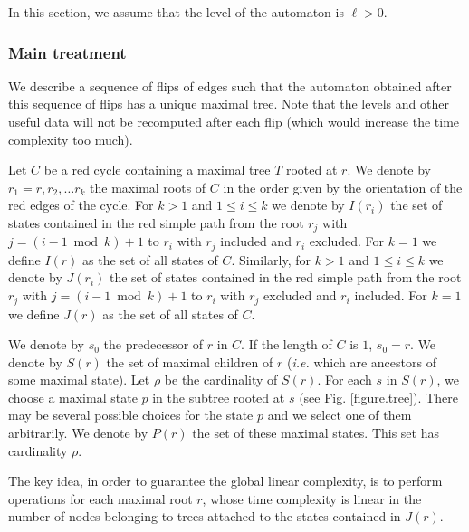 \documentclass[11pt,a4paper]{article}
\def\T{{T}}
\newcommand{\ie}{{\itshape i.e.}\xspace }
\begin{document}
In this section, we assume that the level of the automaton is $\ell > 0$.

\subsubsection{Main treatment}








We describe a sequence of flips of edges such that the automaton
obtained after this sequence of flips has a unique maximal tree. Note
that the levels and other useful data will not be recomputed after
each flip (which would increase the time complexity too much).


Let $C$ be a red cycle containing a maximal tree $\T$ rooted at $r$.
We denote by $r_1=r,r_2, \dotsc r_k$ the maximal roots of $C$ in the
order given by the orientation of the red edges of the cycle.  For $k
> 1$ and $1 \leq i \leq k$ we denote by $I(r_{i})$ the set of states
contained in the red simple path from the root $r_j$ with $j= ({i-1}
\bmod k) +1$ to $r_i$ with $r_j$ included and $r_{i}$ excluded.  For
$k = 1$ we define $I(r)$ as the set of all states of $C$.
Similarly, for  $k > 1$ and $1 \leq i \leq k$ we denote by $J(r_{i})$
the set of states contained in the red simple path from the root $r_j$
with $j= ({i-1} \bmod k) +1$ to $r_i$ with $r_j$ excluded and $r_{i}$
included.  For $k = 1$ we define $J(r)$ as the set of all states of
$C$.


We denote by $s_0$ the predecessor of $r$ in $C$. If the length of
$C$ is $1$, $s_0=r$. We denote by $S(r)$ the set of maximal children
of $r$ (\ie which are ancestors of some maximal state). Let $\rho$ be
the cardinality of $S(r)$. For each $s$ in $S(r)$, we choose a maximal
state $p$ in the subtree rooted at $s$ (see Fig.
\ref{figure.tree}). There may be several possible choices for the
state $p$ and we select one of them arbitrarily. We denote by $P(r)$
the set of these maximal states. This set has cardinality $\rho$.

The key idea, in order to guarantee the global linear complexity, is
to perform operations for each maximal root $r$, whose time complexity
is linear in the number of nodes belonging to trees attached to the
states contained in $J(r)$.
\end{document}
